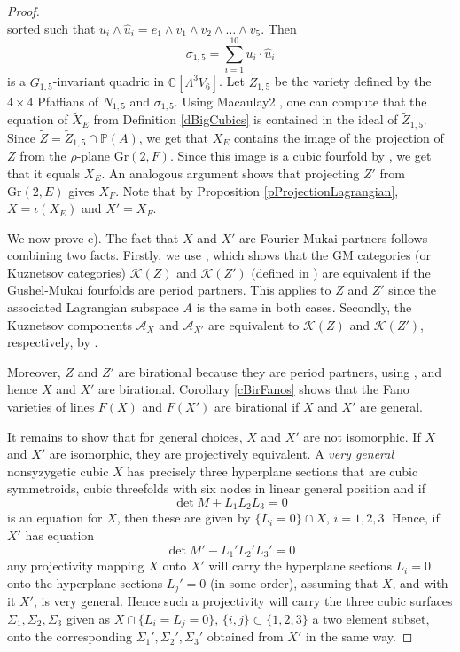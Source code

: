 \documentclass[11pt]{amsart}
\theoremstyle{plain}
\numberwithin{equation}{section}
\theoremstyle{definition}
\theoremstyle{remark}
\newcommand{\bP}{\mathbb{P}}
\begin{document}
\begin{proof}
\[\]
sorted such that $u_i \wedge \hat{u}_i = e_1\wedge v_1\wedge v_2\wedge \dots \wedge v_5$. Then
\[
\sigma_{1,5}= \sum_{i=1}^{10} u_i \cdot \hat{u}_i
\]
is a $G_{1,5}$-invariant quadric in $\mathbb{C}[\Lambda^3 V_6]$. Let $\widetilde{Z}_{1,5}$ be the variety defined by the $4\times 4$ Pfaffians of $N_{1,5}$ and $\sigma_{1,5}$. Using Macaulay2 \cite[Sections5-8.m2]{MacaulayFiles}, one can compute that the equation of $\widetilde{X}_E$ from Definition \ref{dBigCubics} is contained in the ideal of $\widetilde{Z}_{1,5}$. Since $\widetilde{Z} = \widetilde{Z}_{1,5} \cap \bP (A)$, we get that $X_E$ contains the image of the projection of $Z$ from the $\rho$-plane $\mathrm{Gr}(2, F)$. Since this image is a cubic fourfold by \cite[Section 5]{KuzPerry}, we get that it equals $X_E$. An analogous argument shows that projecting $Z'$ from $\mathrm{Gr}(2, E)$ gives $X_F$. Note that by Proposition \ref{pProjectionLagrangian}, $X=\iota(X_E)$ and $X'=X_F$. 
 
\medskip

We now prove c). The fact that $X$ and $X'$ are Fourier-Mukai partners follows combining two facts. Firstly, we use \cite[Thm. 1.6]{KuzPerryCatCones}, which shows that the GM categories (or Kuznetsov categories) $\mathcal{K}(Z)$ and $\mathcal{K}(Z')$ (defined in \cite[Prop. 2.3]{KuzPerry}) are equivalent if the Gushel-Mukai fourfolds are period partners. This applies to $Z$ and $Z'$ since the associated Lagrangian subspace $A$ is the same in both cases. Secondly, the Kuznetsov components $\mathcal{A}_X$ and $\mathcal{A}_{X'}$ are equivalent to $\mathcal{K}(Z)$ and $\mathcal{K}(Z')$, respectively, by \cite[Thm. 5.8]{KuzPerry}. 

Moreover, $Z$ and $Z'$ are birational because they are period partners, using \cite[Thm. 4.15]{DK1}, and hence $X$ and $X'$ are birational. Corollary \ref{cBirFanos} shows that the Fano varieties of lines $F(X)$ and $F(X')$ are birational if $X$ and $X'$ are general. 

It remains to show that for general choices, $X$ and $X'$ are not isomorphic. If $X$ and $X'$ are isomorphic, they are projectively equivalent. A \emph{very general} nonsyzygetic cubic $X$ has precisely three hyperplane sections that are cubic symmetroids, cubic threefolds with six nodes in linear general position and if 
\[
	\det M + L_1L_2L_3 =0 
\]
is an equation for $X$, then these are given by $\{L_i=0\} \cap X$, $i=1,2,3$. Hence, if $X'$ has equation
\[
	\det M' - L_1'L_2'L_3' =0 
\]
any projectivity mapping $X$ onto $X'$ will carry the hyperplane sections $L_i=0$ onto the hyperplane sections $L_j'=0$ (in some order), assuming that $X$, and with it $X'$, is very general.
Hence such a projectivity will carry the three cubic surfaces $\Sigma_1, \Sigma_2, \Sigma_3$ given as $X \cap \{L_i =L_j=0\}$, $\{i, j\} \subset \{ 1,2,3\}$ a two element subset, onto the corresponding $\Sigma_1', \Sigma_2', \Sigma_3'$ obtained from $X'$ in the same way. 


\end{proof}
\end{document}
